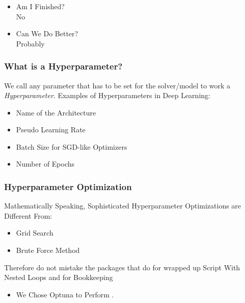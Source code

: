 \begin{frame}
  \frametitle{}
    \begin{itemize}
      \item Am I Finished?
      \pause \\No
      \item Can We Do Better?
      \pause \\Probably
    \end{itemize}

\end{frame}
\begin{frame}
    \frametitle{What is a Hyperparameter?}
    \pause
    We call any parameter that has to be set for the solver/model to work a \emph{Hyperparameter}.
    \newline
    \newline
  \pause  
  Examples of Hyperparameters in Deep Learning:
  \begin{itemize}
    \pause  
    \item Name of the Architecture   
    \pause  
    \item Pseudo Learning Rate
    \pause  
    \item Batch Size for SGD-like Optimizers
    \pause  
    \item Number of Epochs
  \end{itemize}
  \end{frame}

  \begin{frame}
    \frametitle{Hyperparameter Optimization}
    \pause
    \begin{Rem}
      \pause
      Mathematically Speaking, Sophisticated Hyperparameter Optimizations are Different From:
      \begin{itemize}
        \pause
        \item Grid Search
        \pause
        \item Brute Force Method
      \end{itemize}    
    \end{Rem}
      \pause
      Therefore do not mistake the packages that do \ho for wrapped up \bash Script With Nested Loops and
      \awk for Bookkeeping
      \begin{itemize}
        \pause
        \item We Chose Optuna to Perform \ho. 
      \end{itemize}
  \end{frame}
  
